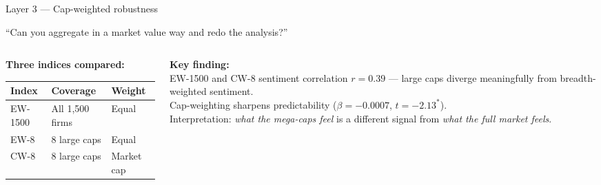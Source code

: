 \documentclass[aspectratio=169, 10pt]{beamer}
\begin{document}
\begin{frame}{Layer 3 --- Cap-weighted robustness}
  \begin{promptbox}[title={\small\faKeyboard\ Prompt 3}]
    ``Can you aggregate in a market value way and redo the analysis?''
  \end{promptbox}

  \vspace{0.5em}
  \begin{columns}[T]
    \begin{column}{0.50\textwidth}
      \textbf{Three indices compared:}\\[0.2em]
      \small
      \begin{tabular}{lll}
        \toprule
        Index & Coverage & Weight\\
        \midrule
        EW-1500 & All 1,500 firms & Equal\\
        EW-8    & 8 large caps & Equal\\
        CW-8    & 8 large caps & Market cap\\
        \bottomrule
      \end{tabular}
    \end{column}
    \begin{column}{0.46\textwidth}
      \textbf{Key finding:}\\[0.3em]
      \small
      EW-1500 and CW-8 sentiment correlation $r = 0.39$ --- large caps
      diverge meaningfully from breadth-weighted sentiment.\\[0.4em]
      Cap-weighting sharpens predictability
      ($\beta = -0.0007$, $t = -2.13^*$).\\[0.4em]
      Interpretation: \textit{what the mega-caps feel} is a different signal
      from \textit{what the full market feels}.
    \end{column}
  \end{columns}
\end{frame}
\end{document}
